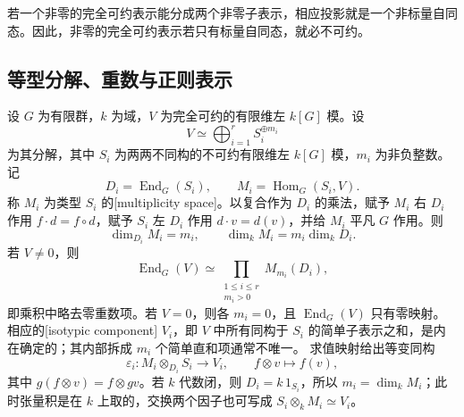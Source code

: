 \ProseParagraphBreak
若一个非零的完全可约表示能分成两个非零子表示，相应投影就是一个非标量自同态。因此，非零的完全可约表示若只有标量自同态，就必不可约。

\subsection{等型分解、重数与正则表示}
\label{b5:subsec:0104:03}

\begin{proposition}\label{b5:prop:isotypic-decomposition}
	设 \(G\) 为有限群，\(k\) 为域，\(V\) 为完全可约的有限维左 \(k[G]\) 模。设
	\[
		V\simeq\bigoplus_{i=1}^r S_i^{\oplus m_i}
	\]
	为其分解，其中 \(S_i\) 为两两不同构的不可约有限维左 \(k[G]\) 模，\(m_i\) 为非负整数。记
	\[
		D_i=\operatorname{End}_G(S_i),\qquad M_i=\operatorname{Hom}_G(S_i,V).
	\]
	称 \(M_i\) 为类型 \(S_i\) 的[multiplicity space]。以复合作为 \(D_i\) 的乘法，赋予 \(M_i\) 右 \(D_i\) 作用 \(f\cdot d=f\circ d\)，赋予 \(S_i\) 左 \(D_i\) 作用 \(d\cdot v=d(v)\)，并给 \(M_i\) 平凡 \(G\) 作用。则
	\[
		\dim_{D_i}M_i=m_i,\qquad \dim_k M_i=m_i\dim_k D_i.
	\]
	若 \(V\ne0\)，则
	\[
		\operatorname{End}_G(V)\simeq\prod_{\substack{1\le i\le r\\m_i>0}}M_{m_i}(D_i),
	\]
	即乘积中略去零重数项。若 \(V=0\)，则各 \(m_i=0\)，且 \(\operatorname{End}_G(V)\) 只有零映射。 相应的[isotypic component] \(V_i\)，即 \(V\) 中所有同构于 \(S_i\) 的简单子表示之和，是内在确定的；其内部拆成 \(m_i\) 个简单直和项通常不唯一。 求值映射给出等变同构
	\[
		\varepsilon_i:M_i\otimes_{D_i}S_i\longrightarrow V_i, \qquad f\otimes v\longmapsto f(v),
	\]
	其中 \(g(f\otimes v)=f\otimes gv\)。若 \(k\) 代数闭，则 \(D_i=k\,1_{S_i}\)，所以 \(m_i=\dim_kM_i\)；此时张量积是在 \(k\) 上取的，交换两个因子也可写成 \(S_i\otimes_kM_i\simeq V_i\)。
\end{proposition}
